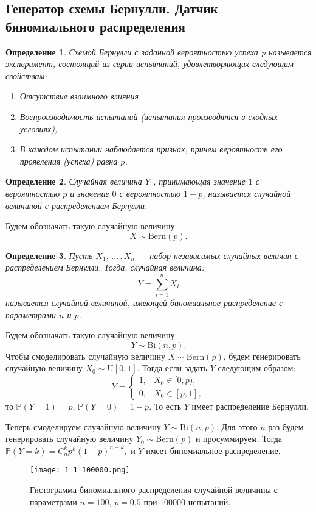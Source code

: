 \documentclass[a4paper, 11pt]{article}
\theoremstyle{def}
\newtheorem{definition}{Определение}[section]
\theoremstyle{th}
\theoremstyle{rem}
\newcommand{\p}{\mathbb{P}}
\begin{document}
\subsection{Генератор схемы Бернулли. Датчик биномиального распределения}

\begin{definition}
        \textit{Схемой Бернулли} с заданной вероятностью успеха p называется эксперимент, состоящий из серии испытаний, удовлетворяющих следующим свойствам:
        \begin{enumerate}
            \item Отсутствие взаимного влияния,
            \item Воспроизводимость испытаний (испытания производятся в сходных условиях),
            \item В каждом испытании наблюдается признак, причем вероятность его проявления (успеха) равна $p$.
        \end{enumerate}
\end{definition}
\begin{definition}
        Случайная величина $Y$ , принимающая значение $1$ с вероятностью $p$ и значение $0$ с вероятностью $1-p$, называется \textit{случайной величиной с распределением Бернулли}.
\end{definition}
Будем обозначать такую случайную величину:
$$
    X \sim \mbox{Bern}(p).
$$
\begin{definition}
    Пусть $X_1,\,\ldots\,, X_n$ — набор независимых случайных величин с распределением Бернулли. Тогда, случайная величина:
        $$Y = \sum\limits_{i=1}^n X_i$$
    называется \textit{случайной величиной, имеющей биномиальное распределение с параметрами $n$ и $p$}.
\end{definition}
Будем обозначать такую случайную величину:
$$
    Y \sim \mbox{Bi}(n, p).
$$
Чтобы смоделировать случайную величину $X \sim \mbox{Bern}(p)$, будем генерировать случайную величину $X_0 \sim \mbox{U}[0, 1]$. Тогда если задать $Y$ следующим образом:
\clearpage
$$
Y = 
\begin{cases}
   1, &\text{$X_0 \in [0, p),$}\\
   0, &\text{$X_0 \in [p, 1],$}
 \end{cases}
$$
то $\p(Y = 1) = p, \, \p(Y = 0) = 1 - p.$ То есть $Y$ имеет распределение Бернулли.

Теперь смоделируем случайную величину $Y \sim \mbox{Bi}(n, p)$. Для этого $n$ раз будем генерировать случайную величину $Y_0 \sim \mbox{Bern}(p)$ и просуммируем. Тогда $\p(Y = k) = C_n^k p^k (1-p)^{n-k},$ и $Y$ имеет биномиальное распределение.
\begin{figure}[h]
    \centering
    \texttt{[image: 1\_1\_100000.png]}
    \caption{Гистограмма биномиального распределения случайной величины с параметрами $n = 100$, $p = 0.5$ при $100000$ испытаний.}
\end{figure}
\end{document}
